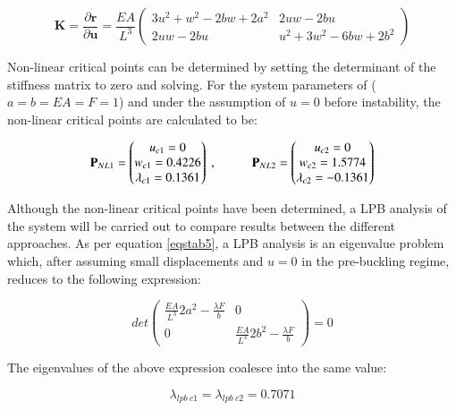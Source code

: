 \begin{equation} 
\mathbf{K} = 
\frac{\partial \mathbf{r}}{\partial \mathbf{u}}
=
\frac{EA}{L^3}
\begin{pmatrix}
3u^2 + w^2 - 2bw +2a^2 & 2uw -2bu \\
2uw - 2bu & u^2 + 3w^2 - 6bw + 2b^2
\end{pmatrix}
\label{eqstab7}
\end{equation}

Non-linear critical points can be determined by setting the determinant of the stiffness matrix to zero and solving. For the system parameters of ($a=b=EA=F=1$) and under the assumption of $u = 0$ before instability, the non-linear critical points are calculated to be:

 \begin{equation} 
\mathbf{P}_{NL1} = 
 \begin{pmatrix}
 u_{c1} = 0 \\
w_{c1} = 0.4226 \\
\lambda_{c1} = 0.1361
 \end{pmatrix}
 \ ,
 \hspace{10mm}
 \mathbf{P}_{NL2} = 
 \begin{pmatrix}
 u_{c2} = 0 \\
 w_{c2} = 1.5774 \\
 \lambda_{c2} = -0.1361
 \end{pmatrix}
 \label{eqstab8}
 \end{equation}
 
Although the non-linear critical points have been determined, a LPB analysis of the system will be carried out to compare results between the different approaches. As per equation \ref{eqstab5}, a LPB analysis is an eigenvalue problem which, after assuming small displacements and $u=0$ in the pre-buckling regime, reduces to the following expression:

 \begin{equation} 
det
\begin{pmatrix}
\frac{EA}{L^3} 2a^2 - \frac{\lambda F}{b} & 0 \\
0 &  \frac{EA}{L^3} 2b^2 - \frac{\lambda F}{b}
\end{pmatrix}
= 0
\label{eqstab9}
\end{equation}

The eigenvalues of the above expression coalesce into the same value:

\begin{equation} 
\lambda_{lpb\ c1} = 
\lambda_{lpb\ c2} = 0.7071
\label{eqstab10}
\end{equation}

